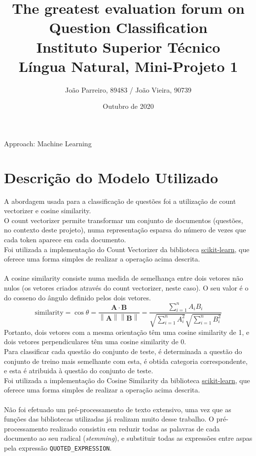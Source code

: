 \documentclass{article}
\title{The greatest evaluation forum on Question Classification\\\large Instituto Superior Técnico\\Língua Natural, Mini-Projeto 1}
\author{João Parreiro, 89483 / João Vieira, 90739}
\date{Outubro de 2020}
\begin{document}
Approach: Machine Learning
{\let\newpage\relax\maketitle}
\section{Descrição do Modelo Utilizado}
A abordagem usada para a classificação de questões foi a utilização de count vectorizer e cosine similarity.\\
O count vectorizer permite transformar um conjunto de documentos (questões, no contexto deste projeto), numa representação esparsa do número de vezes que cada token aparece em cada documento.\\
Foi utilizada a implementação do Count Vectorizer da biblioteca \href{https://scikit-learn.org/stable/modules/generated/sklearn.feature_extraction.text.CountVectorizer.html}{scikit-learn}, que oferece uma forma simples de realizar a operação acima descrita.\\\\
A cosine similarity consiste numa medida de semelhança entre dois vetores não nulos (os vetores criados através do count vectorizer, neste caso). O seu valor é o do cosseno do ângulo definido pelos dois vetores.
\[ \mathrm{similarity} = \cos{\theta} = \frac{\mathbf{A} \cdot \mathbf{B}}{\left\|\mathbf{A}\right\| \left\|\mathbf{B}\right\|} = \frac{\sum_{i=1}^{n}A_iB_i}{\sqrt{\sum_{i=1}^{n}A_i^2}\sqrt{\sum_{i=1}^{n}B_i^2}} \]
Portanto, dois vetores com a mesma orientação têm uma cosine similarity de 1, e dois vetores perpendiculares têm uma cosine similarity de 0.\\
Para classificar cada questão do conjunto de teste, é determinada a questão do conjunto de treino mais semelhante com esta, é obtida categoria correspondente, e esta é atribuida à questão do conjunto de teste.\\
Foi utilizada a implementação do Cosine Similarity da biblioteca \href{https://scikit-learn.org/stable/modules/generated/sklearn.metrics.pairwise.cosine_similarity.html}{scikit-learn}, que oferece uma forma simples de realizar a operação acima descrita.\\\\
Não foi efetuado um pré-processamento de texto extensivo, uma vez que as funções das bibliotecas utilizadas já realizam muito desse trabalho. O pré-processamento realizado consistiu em reduzir todas as palavras de cada documento ao seu radical (\textit{stemming}), e substituir todas as expressões entre aspas pela expressão \texttt{QUOTED\_EXPRESSION}.
\end{document}
